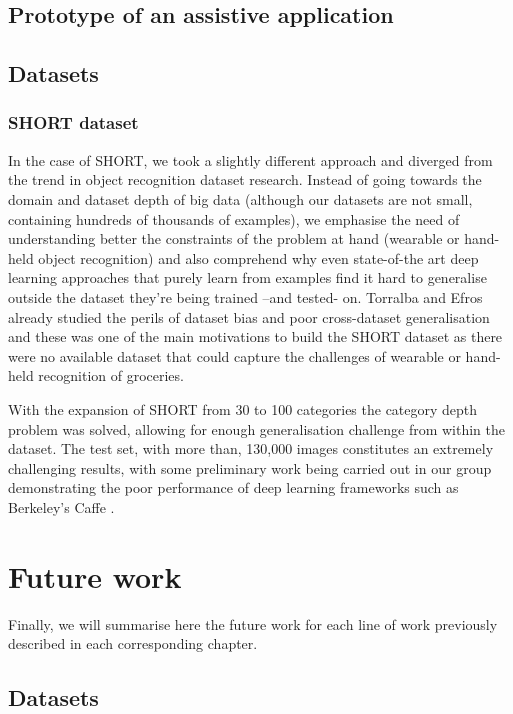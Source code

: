 \subsection{Prototype of an assistive application}

\subsection{Datasets}

\subsubsection{SHORT dataset}

In the case of SHORT, we took a slightly different approach and diverged from the trend in object recognition dataset research. Instead of going towards the domain and dataset depth of big data (although our datasets are not small, containing hundreds of thousands of examples), we emphasise the need of understanding better the constraints of the problem at hand (wearable or hand-held object recognition) and also comprehend why even state-of-the art deep learning approaches that purely learn from examples find it hard to generalise outside the dataset they're being trained --and tested- on. Torralba and Efros already studied the perils of dataset bias and poor cross-dataset generalisation \cite{torralba2011unbiased} and these was one of the main motivations to build the SHORT dataset as there were no available dataset that could capture the challenges of wearable or hand-held recognition of groceries.

With the expansion of SHORT from 30 to 100 categories the category depth problem was solved, allowing for enough generalisation challenge from within the dataset. The test set, with more than, 130,000 images constitutes an extremely challenging results, with some preliminary work  being carried out in our group demonstrating the poor performance of deep learning frameworks such as Berkeley's Caffe \cite{jia2014caffe}.

\section{Future work}

Finally, we will summarise here the future work for each line of work previously described in each corresponding chapter.

\subsection{Datasets}

